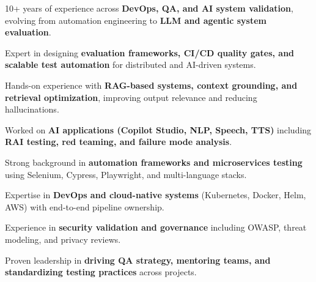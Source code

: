 

\begin{cventries}
\begin{cvitemize}
  \item {10+ years of experience across \textbf{DevOps, QA, and AI system validation}, evolving from automation engineering to \textbf{LLM and agentic system evaluation}.}
  \item {Expert in designing \textbf{evaluation frameworks, CI/CD quality gates, and scalable test automation} for distributed and AI-driven systems.}
  \item {Hands-on experience with \textbf{RAG-based systems, context grounding, and retrieval optimization}, improving output relevance and reducing hallucinations.}
  \item {Worked on \textbf{AI applications (Copilot Studio, NLP, Speech, TTS)} including \textbf{RAI testing, red teaming, and failure mode analysis}.}
  \item {Strong background in \textbf{automation frameworks and microservices testing} using Selenium, Cypress, Playwright, and multi-language stacks.}
  \item {Expertise in \textbf{DevOps and cloud-native systems} (Kubernetes, Docker, Helm, AWS) with end-to-end pipeline ownership.}
  \item {Experience in \textbf{security validation and governance} including OWASP, threat modeling, and privacy reviews.}
  \item {Proven leadership in \textbf{driving QA strategy, mentoring teams, and standardizing testing practices} across projects.}
\end{cvitemize}
\end{cventries}
